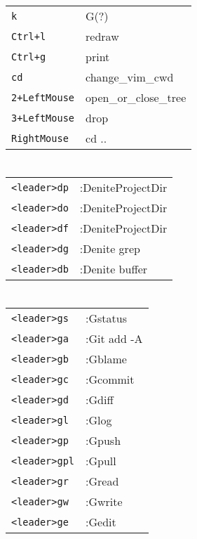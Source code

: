 \begin{multicols}{3}
\begin{tabular}{@{}ll@{}}
		\verb!k!           & G(?)                   \\
		\verb!Ctrl+l!      & redraw                 \\
		\verb!Ctrl+g!      & print                  \\
		\verb!cd!          & change\_vim\_cwd       \\
		\verb!2+LeftMouse! & open\_or\_close\_tree  \\
		\verb!3+LeftMouse! & drop                   \\
		\verb!RightMouse!  & cd ..                  \\
	\end{tabular}

	\section{}
	\begin{tabular}{@{}ll@{}}
		\verb!<leader>dp! & :DeniteProjectDir \\
		\verb!<leader>do! & :DeniteProjectDir \\
		\verb!<leader>df! & :DeniteProjectDir \\
		\verb!<leader>dg! & :Denite grep      \\
		\verb!<leader>db! & :Denite buffer    \\
	\end{tabular}

	\section{}
	\begin{tabular}{@{}ll@{}}
		\verb!<leader>gs!  & :Gstatus    \\
		\verb!<leader>ga!  & :Git add -A \\
		\verb!<leader>gb!  & :Gblame     \\
		\verb!<leader>gc!  & :Gcommit    \\
		\verb!<leader>gd!  & :Gdiff      \\
		\verb!<leader>gl!  & :Glog       \\
		\verb!<leader>gp!  & :Gpush      \\
		\verb!<leader>gpl! & :Gpull      \\
		\verb!<leader>gr!  & :Gread      \\
		\verb!<leader>gw!  & :Gwrite     \\
		\verb!<leader>ge!  & :Gedit      \\
	\end{tabular}


\end{multicols}
